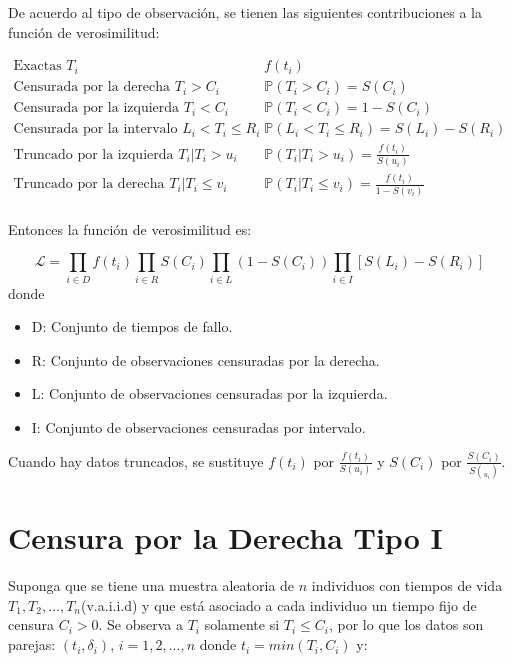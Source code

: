 \documentclass[
  a4paper,
  oneside,
  openany]{book}
\providecommand{\tightlist}{%
  \setlength{\itemsep}{0pt}\setlength{\parskip}{0pt}}
\begin{document}
De acuerdo al tipo de observación, se tienen las siguientes contribuciones a la función de verosimilitud:

\[
\begin{array}{ll}
\mbox{Exactas } T_{i} & f(t_{i})\\
\mbox{Censurada por la derecha } T_{i}>C_{i} & \mathbb{P}(T_{i}>C_{i})=S(C_{i})\\
\mbox{Censurada por la izquierda } T_{i}<C_{i} & \mathbb{P}(T_{i}<C_{i})=1-S(C_{i})\\
\mbox{Censurada por la intervalo } L_{i}<T_{i}\leq R_{i} & \mathbb{P}(L_{i}<T_{i}\leq R_{i})=S(L_{i})-S(R_{i})\\
\mbox{Truncado por la izquierda } T_{i}|T_{i}>u_{i} & \mathbb{P}(T_{i}|T_{i}>u_{i})=\frac{f(t_{i})}{S(u_{i})}\\
\mbox{Truncado por la derecha } T_{i}|T_{i} \leq v_{i} & \mathbb{P}(T_{i}|T_{i} \leq v_{i})=\frac{f(t_{i})}{1-S(v_{i})}\\
\end{array}
\]

Entonces la función de verosimilitud es:

\[
\mathbf{\mathscr{L}} = \prod_{i\in D}f(t_{i})\prod_{i\in R}S(C_{i})\prod_{i\in L}(1-S(C_{i}))\prod_{i\in I}[S(L_{i})-S(R_{i})]
\]
donde

\begin{itemize}
\tightlist
\item
  D: Conjunto de tiempos de fallo.
\item
  R: Conjunto de observaciones censuradas por la derecha.
\item
  L: Conjunto de observaciones censuradas por la izquierda.
\item
  I: Conjunto de observaciones censuradas por intervalo.
\end{itemize}

Cuando hay datos truncados, se sustituye \(f(t_{i})\) por \(\frac{f(t_{i})}{S(u_{i})}\) y \(S(C_{i})\) por \(\frac{S(C_{i})}{S(_{u_{i}})}\).

\hypertarget{censura-por-la-derecha-tipo-i-1}{%
\section{Censura por la Derecha Tipo I}\label{censura-por-la-derecha-tipo-i-1}}

Suponga que se tiene una muestra aleatoria de \(n\) individuos con tiempos de vida \(T_1,T_2,..., T_n\)(v.a.i.i.d) y que está asociado a cada individuo un tiempo fijo de censura \(C_i>0\). Se observa a \(T_i\) solamente si \(T_i\leq C_i\), por lo que los datos son parejas: \((t_i,\delta_i)\), \(i=1,2,...,n\) donde \(t_i=min(T_i,C_i)\) y:
\end{document}
